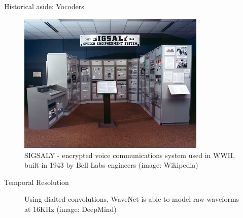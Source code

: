 \documentclass{beamer}
\begin{document}
\begin{frame}{Historical aside: Vocoders}
  \begin{figure}
    \includegraphics[width=0.8\textwidth]{img/sigsaly.jpg}
    \caption{SIGSALY - encrypted voice communications system used in WWII, built in 1943 by Bell Labs engineers (image: Wikipedia)}
  \end{figure}
\end{frame}


    \begin{frame}{Temporal Resolution}
      \begin{figure}
      \caption{Using dialted convolutions, WaveNet is able to model raw waveforms at 16KHz (image: DeepMind)}
    \end{figure}
    \end{frame}
\end{document}
